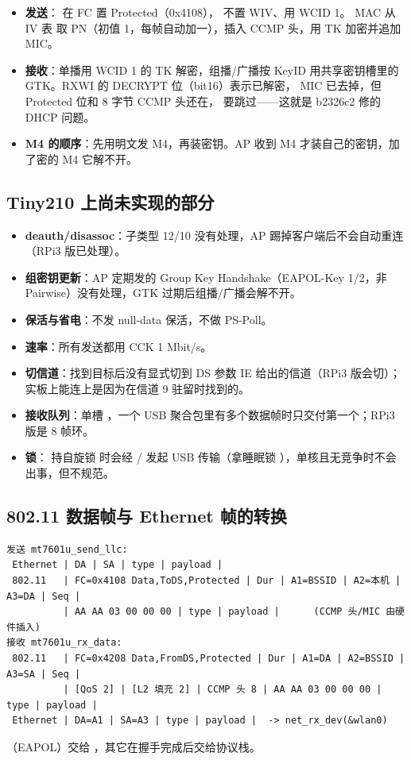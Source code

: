 \begin{itemize}[leftmargin=2em,itemsep=0pt]
\item \textbf{发送}： 在 FC 置 Protected（0x4108）， 不置 WIV、用 WCID 1。
  MAC 从 IV 表  取 PN（初值 1，每帧自动加一），插入 CCMP 头，用 TK 加密并追加 MIC。
\item \textbf{接收}：单播用 WCID 1 的 TK 解密，组播/广播按 KeyID 用共享密钥槽里的 GTK。RXWI 的 DECRYPT 位（bit16）表示已解密，
  MIC 已去掉，但 Protected 位和 8 字节 CCMP 头还在， 要跳过——这就是 b2326c2 修的 DHCP 问题。
\item \textbf{M4 的顺序}：先用明文发 M4，再装密钥。AP 收到 M4 才装自己的密钥，加了密的 M4 它解不开。
\end{itemize}

\subsection{Tiny210 上尚未实现的部分}

\begin{itemize}[leftmargin=2em,itemsep=0pt]
\item \textbf{deauth/disassoc}：子类型 12/10 没有处理，AP 踢掉客户端后不会自动重连（RPi3 版已处理）。
\item \textbf{组密钥更新}：AP 定期发的 Group Key Handshake（EAPOL-Key 1/2，非 Pairwise）没有处理，GTK 过期后组播/广播会解不开。
\item \textbf{保活与省电}：不发 null-data 保活，不做 PS-Poll。
\item \textbf{速率}：所有发送都用 CCK 1 Mbit/s。
\item \textbf{切信道}：找到目标后没有显式切到 DS 参数 IE 给出的信道（RPi3 版会切）；实板上能连上是因为在信道 9 驻留时找到的。
\item \textbf{接收队列}：单槽 ，一个 USB 聚合包里有多个数据帧时只交付第一个；RPi3 版是 8 帧环。
\item \textbf{锁}： 持自旋锁  时会经 / 发起 USB 传输（拿睡眠锁 ），单核且无竞争时不会出事，但不规范。
\end{itemize}

\subsection{802.11 数据帧与 Ethernet 帧的转换}

\begin{lstlisting}
发送 mt7601u_send_llc:
 Ethernet | DA | SA | type | payload |
 802.11   | FC=0x4108 Data,ToDS,Protected | Dur | A1=BSSID | A2=本机 | A3=DA | Seq |
          | AA AA 03 00 00 00 | type | payload |      (CCMP 头/MIC 由硬件插入)
接收 mt7601u_rx_data:
 802.11   | FC=0x4208 Data,FromDS,Protected | Dur | A1=DA | A2=BSSID | A3=SA | Seq |
          | [QoS 2] | [L2 填充 2] | CCMP 头 8 | AA AA 03 00 00 00 | type | payload |
 Ethernet | DA=A1 | SA=A3 | type | payload |  -> net_rx_dev(&wlan0)
\end{lstlisting}
（EAPOL）交给 ，其它在握手完成后交给协议栈。

